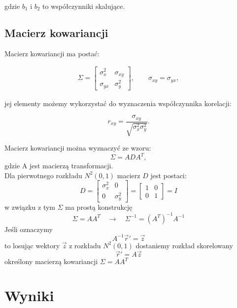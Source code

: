 \documentclass[a4paper,12pt,twoside]{article}
\begin{document}
gdzie $b_1$ i $b_2$ to współczynniki skalujące. \\

\subsection{Macierz kowariancji}

Macierz kowariancji ma postać:

\begin{equation}
    \begin{gathered}
        \Sigma =
        \begin{bmatrix}
            \sigma_x^2 & \sigma_{xy} \\
            \sigma_{yx} & \sigma_y^2
        \end{bmatrix},
        \quad \quad
        \sigma_{xy} = \sigma_{yx},
    \end{gathered} \tag{5}
\end{equation}

jej elementy możemy wykorzystać do wyznaczenia współczynnika korelacji:

\begin{equation}
r_{xy} = \frac{\sigma_{xy}}{\sqrt{\sigma_x^2 \sigma_y^2}}. \tag{6}
\end{equation}


Macierz kowariancji można wyznaczyć ze wzoru:
\[
\Sigma = A D A^T,
\]
gdzie A jest macierzą transformacji. \\
Dla pierwotnego rozkładu \( N^2(0,1) \) macierz $D$ jest postaci:
\[
D =
\begin{bmatrix}
    \sigma_x^2 & 0 \\
    0 & \sigma_y^2
\end{bmatrix}
=
\begin{bmatrix}
    1 & 0 \\
    0 & 1
\end{bmatrix} = I
\]
w związku z tym $\Sigma$ ma prostą konstrukcję
\[
\Sigma = A A^T \quad \rightarrow \quad \Sigma^{-1} = (A^T)^{-1} A^{-1}
\]
Jeśli oznaczymy
\[
A^{-1} \vec{r}' = \vec{z}
\]
to losując wektory \( \vec{z} \) z rozkładu \( N^2(0,1) \) dostaniemy rozkład skorelowany
\[
\vec{r}' = A \vec{z}
\]
określony macierzą kowariancji \( \Sigma = A A^T \)


 
\section{Wyniki}
\end{document}
